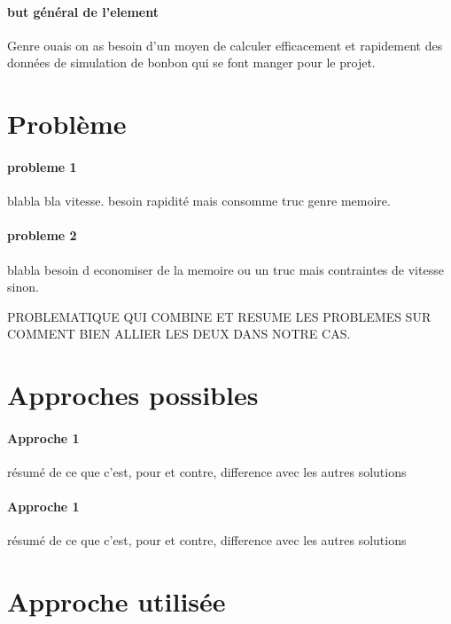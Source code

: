 \documentclass[
	headsepline=on,
	footsepline=on,
	twoside=off,
	abstract=on,
	DIV=10
]{scrreprt}
\begin{document}
				\paragraph{but général de l'element}
				Genre ouais on as besoin d'un moyen de calculer efficacement et rapidement des données de simulation de bonbon qui se font manger pour le projet.
				 
			
			\section{Problème}
			
				\paragraph{probleme 1}
				blabla bla vitesse. besoin rapidité mais consomme truc genre memoire.
				
				\paragraph{probleme 2}
				blabla besoin d economiser de la memoire ou un truc mais contraintes de vitesse sinon.
			
				\begin{problem}
					PROBLEMATIQUE QUI COMBINE ET RESUME LES PROBLEMES SUR COMMENT BIEN ALLIER LES DEUX DANS NOTRE CAS.
				\end{problem}
			
			\section{Approches possibles}
			
				\paragraph{Approche 1}
				résumé de ce que c'est, pour et contre, difference avec les autres solutions
				
				
				\paragraph{Approche 1}
				résumé de ce que c'est, pour et contre, difference avec les autres solutions
			
			\section{Approche utilisée}
			
\end{document}
